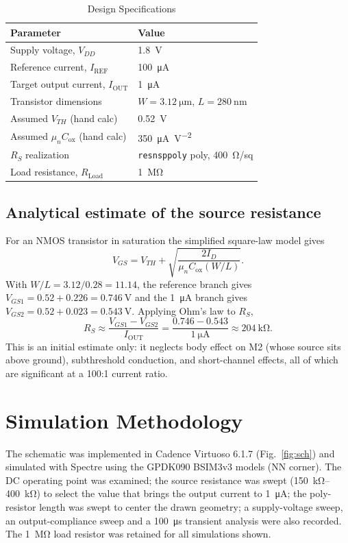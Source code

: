 \documentclass[conference]{IEEEtran}
\begin{document}
\begin{table}[!t]
\caption{Design Specifications}
\label{tab:spec}
\centering
\begin{tabular}{ll}
\toprule
Parameter & Value \\
\midrule
Supply voltage, $V_{DD}$ & \SI{1.8}{\volt} \\
Reference current, $I_\mathrm{REF}$ & \SI{100}{\micro\ampere} \\
Target output current, $I_\mathrm{OUT}$ & \SI{1}{\micro\ampere} \\
Transistor dimensions & $W=\SI{3.12}{\micro\metre}$, $L=\SI{280}{\nano\metre}$ \\
Assumed $V_{TH}$ (hand calc) & \SI{0.52}{\volt} \\
Assumed $\mu_n C_\mathrm{ox}$ (hand calc) & \SI{350}{\micro\ampere\per\volt\squared} \\
$R_S$ realization & \texttt{resnsppoly} poly, \SI{400}{\ohm}/sq \\
Load resistance, $R_\mathrm{Load}$ & \SI{1}{\mega\ohm} \\
\bottomrule
\end{tabular}
\end{table}

\subsection{Analytical estimate of the source resistance}
For an NMOS transistor in saturation the simplified square-law model gives
\begin{equation}
V_{GS} = V_{TH} + \sqrt{\frac{2 I_D}{\mu_n C_\mathrm{ox} (W/L)}}.
\end{equation}
With $W/L = 3.12/0.28 = 11.14$, the reference branch gives
$V_{GS1} = 0.52 + 0.226 = \SI{0.746}{\volt}$ and the \SI{1}{\micro\ampere}
branch gives $V_{GS2} = 0.52 + 0.023 = \SI{0.543}{\volt}$. Applying Ohm's law
to $R_S$,
\begin{equation}
R_S \approx \frac{V_{GS1}-V_{GS2}}{I_\mathrm{OUT}}
     = \frac{0.746-0.543}{\SI{1}{\micro\ampere}} \approx \SI{204}{\kilo\ohm}.
\end{equation}
This is an initial estimate only: it neglects body effect on M2 (whose source
sits above ground), subthreshold conduction, and short-channel effects, all
of which are significant at a 100:1 current ratio.

\section{Simulation Methodology}
The schematic was implemented in Cadence Virtuoso 6.1.7
(Fig.~\ref{fig:sch}) and simulated with Spectre using the GPDK090 BSIM3v3
models (NN corner). The DC operating point was examined; the source
resistance was swept (\SIrange{150}{400}{\kilo\ohm}) to select the value that
brings the output current to \SI{1}{\micro\ampere}; the poly-resistor length
was swept to center the drawn geometry; a supply-voltage sweep, an
output-compliance sweep and a \SI{100}{\micro\second} transient analysis were
also recorded. The \SI{1}{\mega\ohm} load resistor was retained for all
simulations shown.
\end{document}
